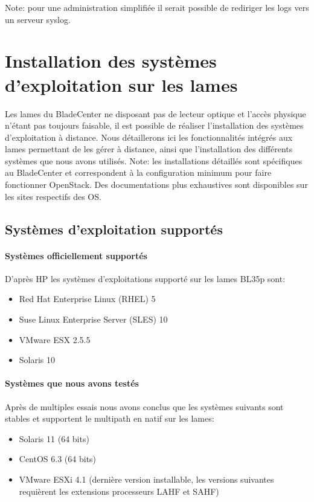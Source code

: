 \documentclass[a4paper,oneside]{report}
\begin{document}
\noindent Note: pour une administration simplifiée il serait possible de rediriger les logs vers un serveur \gls{syslog}.


\chapter{Installation des systèmes d'exploitation sur les lames} \label{sec:installos}
Les lames du BladeCenter ne disposant pas de lecteur optique et l'accès physique n'étant pas toujours faisable, il est possible de réaliser l'installation des systèmes d'exploitation à distance.
Nous détaillerons ici les fonctionnalités intégrés aux lames permettant de les gérer à distance, ainsi que l'installation des différents systèmes que nous avons utilisés.\newline
Note: les installations détaillés sont spécifiques au BladeCenter et correspondent à la configuration minimum pour faire fonctionner OpenStack. Des documentations plus exhaustives sont disponibles sur les sites respectifs des OS.

\section{Systèmes d'exploitation supportés}
\subsubsection{Systèmes officiellement supportés}
D'après HP les systèmes d'exploitations supporté sur les lames BL35p sont:
\begin{itemize}
\item Red Hat Enterprise Linux (RHEL) 5
\item Suse Linux Enterprise Server (SLES) 10
\item VMware ESX 2.5.5
\item Solaris 10
\end{itemize}

\subsubsection{Systèmes que nous avons testés}
Après de multiples essais nous avons conclus que les systèmes suivants sont stables et supportent le multipath en natif sur les lames:
\begin{itemize}
\item Solaris 11 (64 bits)
\item CentOS 6.3 (64 bits)
\item VMware ESXi 4.1 (dernière version installable, les versions suivantes requièrent les extensions processeurs LAHF et SAHF)
\end{itemize}
\end{document}
